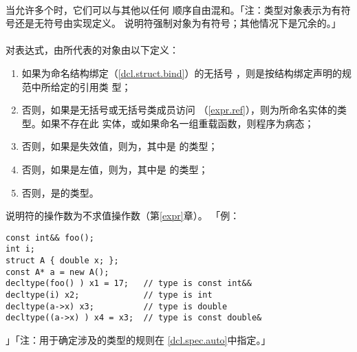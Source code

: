 \paragraph{}
当允许多个时，它们可以与其他以任何
顺序自由混和。「注：类型对象表示为有符号还是无符号由实现定义。
说明符强制对象为有符号；其他情况下是冗余的。」

\paragraph{}
对表达式，由所代表的对象由以下定义：
\begin{enumerate}
  \item{如果为命名结构绑定（\ref{dcl.struct.bind}）的无括号
    ，则是按结构绑定声明的规范中所给定的引用类
    型；}
  \item{否则，如果是无括号或无括号类成员访问
    （\ref{expr.ref}），则为所命名实体的类型。如果不存在此
    实体，或如果命名一组重载函数，则程序为病态；}
  \item{否则，如果是失效值，则为，其中是
    的类型；}
  \item{否则，如果是左值，则为，其中是
    的类型；}
  \item{否则，是的类型。}
\end{enumerate}
说明符的操作数为不求值操作数（第\ref{expr}章）。
「例：
\begin{lstlisting}
const int&& foo();
int i;
struct A { double x; };
const A* a = new A();
decltype(foo() ) x1 = 17;   // type is const int&&
decltype(i) x2;             // type is int
decltype(a->x) x3;          // type is double
decltype((a->x) ) x4 = x3;  // type is const double&
\end{lstlisting}」「注：用于确定涉及的类型的规则在
\ref{dcl.spec.auto}中指定。」

